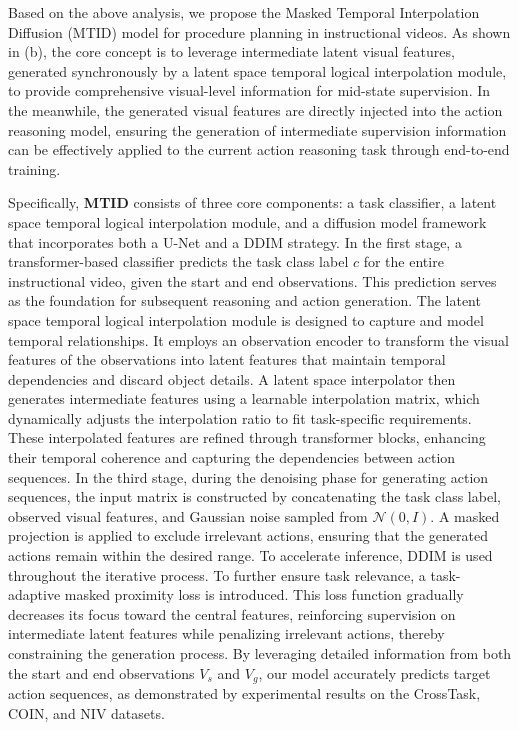 


Based on the above analysis, we propose the Masked Temporal Interpolation Diffusion (MTID) model for procedure planning in instructional videos. 
As shown in (b), the core concept is to leverage intermediate latent visual features, generated synchronously by a latent space temporal logical interpolation module, to provide comprehensive visual-level information for mid-state supervision. 
In the meanwhile, the generated visual features are directly injected into the action reasoning model, ensuring the generation of intermediate supervision information can be effectively applied to the current action reasoning task through end-to-end training.

Specifically, \textbf{MTID} consists of three core components: a task classifier, a latent space temporal logical interpolation module, and a diffusion model framework that incorporates both a U-Net and a DDIM strategy.
In the first stage, a transformer-based classifier predicts the task class label $c$ for the entire instructional video, given the start and end observations. This prediction serves as the foundation for subsequent reasoning and action generation.
The latent space temporal logical interpolation module is designed to capture and model temporal relationships. 
It employs an observation encoder to transform the visual features of the observations into latent features that maintain temporal dependencies and discard object details. 
A latent space interpolator then generates intermediate features using a learnable interpolation matrix, which dynamically adjusts the interpolation ratio to fit task-specific requirements. 
These interpolated features are refined through transformer blocks, enhancing their temporal coherence and capturing the dependencies between action sequences.
In the third stage, during the denoising phase for generating action sequences, the input matrix is constructed by concatenating the task class label, observed visual features, and Gaussian noise sampled from $\mathcal{N}(0, I)$. 
A masked projection is applied to exclude irrelevant actions, ensuring that the generated actions remain within the desired range. 
To accelerate inference, DDIM is used throughout the iterative process.
To further ensure task relevance, a task-adaptive masked proximity loss is introduced. This loss function gradually decreases its focus toward the central features, reinforcing supervision on intermediate latent features while penalizing irrelevant actions, thereby constraining the generation process. 
By leveraging detailed information from both the start and end observations $V_s$ and $V_g$, our model accurately predicts target action sequences, as demonstrated by experimental results on the CrossTask, COIN, and NIV datasets.

